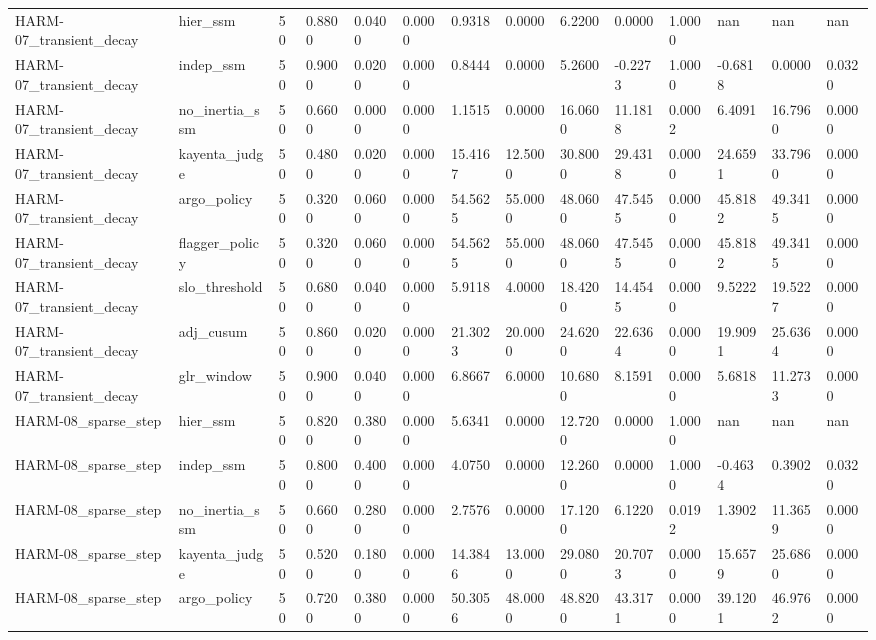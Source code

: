 \begin{table}[htbp]
\begin{tabular}{llllllllllllll}
HARM-07\_transient\_decay & hier\_ssm & 50 & 0.8800 & 0.0400 & 0.0000 & 0.9318 & 0.0000 & 6.2200 & 0.0000 & 1.0000 & nan & nan & nan \\
HARM-07\_transient\_decay & indep\_ssm & 50 & 0.9000 & 0.0200 & 0.0000 & 0.8444 & 0.0000 & 5.2600 & -0.2273 & 1.0000 & -0.6818 & 0.0000 & 0.0320 \\
HARM-07\_transient\_decay & no\_inertia\_ssm & 50 & 0.6600 & 0.0000 & 0.0000 & 1.1515 & 0.0000 & 16.0600 & 11.1818 & 0.0002 & 6.4091 & 16.7960 & 0.0000 \\
HARM-07\_transient\_decay & kayenta\_judge & 50 & 0.4800 & 0.0200 & 0.0000 & 15.4167 & 12.5000 & 30.8000 & 29.4318 & 0.0000 & 24.6591 & 33.7960 & 0.0000 \\
HARM-07\_transient\_decay & argo\_policy & 50 & 0.3200 & 0.0600 & 0.0000 & 54.5625 & 55.0000 & 48.0600 & 47.5455 & 0.0000 & 45.8182 & 49.3415 & 0.0000 \\
HARM-07\_transient\_decay & flagger\_policy & 50 & 0.3200 & 0.0600 & 0.0000 & 54.5625 & 55.0000 & 48.0600 & 47.5455 & 0.0000 & 45.8182 & 49.3415 & 0.0000 \\
HARM-07\_transient\_decay & slo\_threshold & 50 & 0.6800 & 0.0400 & 0.0000 & 5.9118 & 4.0000 & 18.4200 & 14.4545 & 0.0000 & 9.5222 & 19.5227 & 0.0000 \\
HARM-07\_transient\_decay & adj\_cusum & 50 & 0.8600 & 0.0200 & 0.0000 & 21.3023 & 20.0000 & 24.6200 & 22.6364 & 0.0000 & 19.9091 & 25.6364 & 0.0000 \\
HARM-07\_transient\_decay & glr\_window & 50 & 0.9000 & 0.0400 & 0.0000 & 6.8667 & 6.0000 & 10.6800 & 8.1591 & 0.0000 & 5.6818 & 11.2733 & 0.0000 \\
HARM-08\_sparse\_step & hier\_ssm & 50 & 0.8200 & 0.3800 & 0.0000 & 5.6341 & 0.0000 & 12.7200 & 0.0000 & 1.0000 & nan & nan & nan \\
HARM-08\_sparse\_step & indep\_ssm & 50 & 0.8000 & 0.4000 & 0.0000 & 4.0750 & 0.0000 & 12.2600 & 0.0000 & 1.0000 & -0.4634 & 0.3902 & 0.0320 \\
HARM-08\_sparse\_step & no\_inertia\_ssm & 50 & 0.6600 & 0.2800 & 0.0000 & 2.7576 & 0.0000 & 17.1200 & 6.1220 & 0.0192 & 1.3902 & 11.3659 & 0.0000 \\
HARM-08\_sparse\_step & kayenta\_judge & 50 & 0.5200 & 0.1800 & 0.0000 & 14.3846 & 13.0000 & 29.0800 & 20.7073 & 0.0000 & 15.6579 & 25.6860 & 0.0000 \\
HARM-08\_sparse\_step & argo\_policy & 50 & 0.7200 & 0.3800 & 0.0000 & 50.3056 & 48.0000 & 48.8200 & 43.3171 & 0.0000 & 39.1201 & 46.9762 & 0.0000 \\

\end{tabular}
\end{table}
